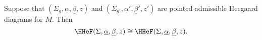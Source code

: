 

    Suppose that $(\Sigma_g,\underline \alpha, \underline \beta,z)$ and $(\Sigma_{g'},\underline \alpha', \underline \beta',z')$ are pointed admissible Heegaard diagrams for $M$. Then
    \[\HHeF(\Sigma, \underline{\alpha}, \underline{\beta},z)\cong\HHeF(\Sigma, \underline{\alpha}, \underline{\beta},z).\]
